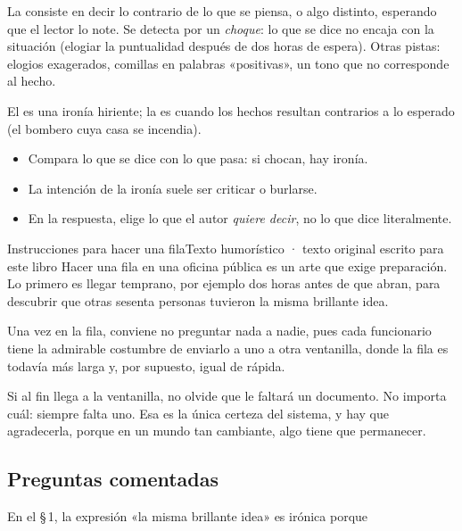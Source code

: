 \bitacora


La  consiste en decir lo contrario de lo que se piensa, o algo distinto, esperando que el lector lo note.
Se detecta por un \emph{choque}: lo que se dice no encaja con la situación (elogiar la puntualidad después de dos horas de
espera). Otras pistas: elogios exagerados, comillas en palabras «positivas», un tono que no corresponde al hecho.

El  es una ironía hiriente; la  es cuando los hechos resultan contrarios a lo
esperado (el bombero cuya casa se incendia).


\begin{regla}
\begin{itemize}
  \item Compara lo que se dice con lo que pasa: si chocan, hay ironía.
  \item La intención de la ironía suele ser criticar o burlarse.
  \item En la respuesta, elige lo que el autor \emph{quiere decir}, no lo que dice literalmente.
\end{itemize}
\end{regla}

\begin{texto}{Instrucciones para hacer una fila}{Texto humorístico · texto original escrito para este libro}
\pa Hacer una fila en una oficina pública es un arte que exige preparación. Lo primero es llegar temprano, por ejemplo
dos horas antes de que abran, para descubrir que otras sesenta personas tuvieron la misma brillante idea.

\pa Una vez en la fila, conviene no preguntar nada a nadie, pues cada funcionario tiene la admirable costumbre de enviarlo
a uno a otra ventanilla, donde la fila es todavía más larga y, por supuesto, igual de rápida.

\pa Si al fin llega a la ventanilla, no olvide que le faltará un documento. No importa cuál: siempre falta uno. Esa es la
única certeza del sistema, y hay que agradecerla, porque en un mundo tan cambiante, algo tiene que permanecer.
\end{texto}

\subsection{Preguntas comentadas}
\begin{comentada}{En el \S\,1, la expresión «la misma brillante idea» es irónica porque}
\end{comentada}

